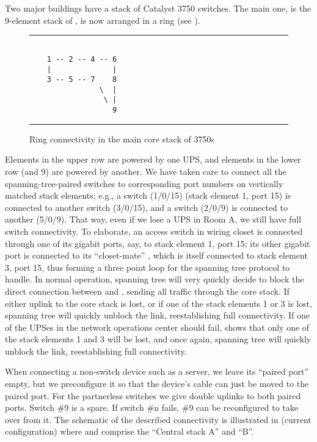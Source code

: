 Two major buildings have a stack of {\cisco} Catalyst 3750 switches.
The main one, is the 9-element stack of {\BigSwitchOne}, is now arranged in a ring
(see ).
\begin{figure}[htpb!]\hrule
\begin{verbatim}

    1 -- 2 -- 4 -- 6
    |              |
    3 -- 5 -- 7    8
                \  |
                 \ |
                   9
\end{verbatim}
\hrule
\caption{Ring connectivity in the main core stack of 3750s}\label{fig:stack-ring}\end{figure}
Elements in the upper row are powered by one UPS, and
elements in the lower row (and 9) are powered by another.
We have taken care to connect all the spanning-tree-paired switches
to corresponding port numbers on vertically matched stack elements;
e.g., a switch  (1/0/15) (stack element 1, port 15) is connected to another switch  (3/0/15), and
a switch  (2/0/9) is connected to another  (5/0/9).  That way,
even if we lose a UPS in Room A, we still have full switch
connectivity.
To elaborate, an access switch  in wiring closet  is connected through
one of its gigabit ports, say, to stack element 1, port 15; its
other gigabit port is connected to its ``closet-mate'' , which
is itself connected to stack element 3, port 15, thus forming
a three point loop for the spanning tree protocol to handle.
In normal operation, spanning tree will very quickly decide
to block the direct connection between  and , sending
all traffic through the core stack. If either uplink to the
core stack is lost, or if one of the stack elements 1 or 3
is lost, spanning tree will quickly unblock the  link,
reestablishing full connectivity. If one of the UPSes in the
network operations center should fail,  shows that
only one of the stack elements 1 and 3 will be lost, and once
again, spanning tree will quickly unblock the  link,
reestablishing full connectivity.

When connecting a non-switch device such as a server, we
leave its ``paired port'' empty, but we preconfigure
it so that the device's cable can just be moved to the
paired port.
For the partnerless switches we give
double uplinks to both paired ports.
Switch \#9 is a spare. If switch \#n fails, \#9 can 
be reconfigured to take over from it.
The schematic of the described connectivity is illustrated
in  (current configuration) where {\BigSwitchOne}
and {\BigSwitchTwo} comprise the ``Central stack A'' and ``B''.

